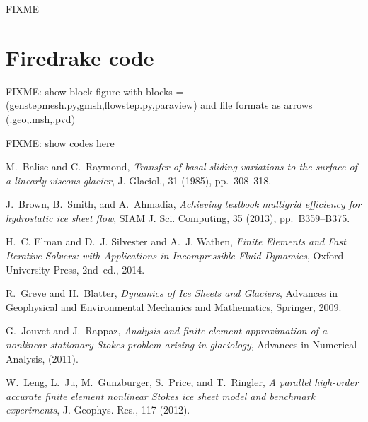 \documentclass[letterpaper,final,12pt,reqno]{amsart}
\begin{document}
FIXME

\section{Firedrake code}

FIXME: show block figure with blocks = (genstepmesh.py,gmsh,flowstep.py,paraview) and file formats as arrows (.geo,.msh,.pvd)

FIXME: show codes here



\footnotesize

\bigskip

\begin{thebibliography}{6}

{\sc M.~Balise and C.~Raymond}, {\em Transfer of basal sliding variations to
  the surface of a linearly-viscous glacier}, J. Glaciol., 31 (1985),
  pp.~308--318.

{\sc J.~Brown, B.~Smith, and A.~Ahmadia}, {\em Achieving textbook multigrid
  efficiency for hydrostatic ice sheet flow}, SIAM J. Sci. Computing,
  35 (2013), pp.~B359--B375.

{\sc H.~C. Elman and D.~J. Silvester and A.~J. Wathen}, {\em Finite Elements
  and Fast Iterative Solvers: with Applications in Incompressible Fluid Dynamics},
  Oxford University Press, 2nd~ed., 2014.

{\sc R.~Greve and H.~Blatter}, {\em Dynamics of {I}ce {S}heets and {G}laciers},
  Advances in Geophysical and Environmental Mechanics and Mathematics,
  Springer, 2009.

{\sc G.~Jouvet and J.~Rappaz}, {\em Analysis and finite element approximation
  of a nonlinear stationary {S}tokes problem arising in glaciology}, Advances
  in Numerical Analysis, (2011).

{\sc W.~Leng, L.~Ju, M.~Gunzburger, S.~Price, and T.~Ringler}, {\em A parallel
  high-order accurate finite element nonlinear {S}tokes ice sheet model and
  benchmark experiments}, J. Geophys. Res., 117 (2012).

\end{thebibliography}
\end{document}
